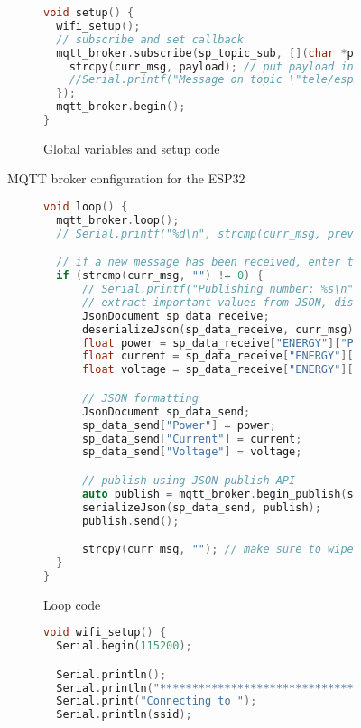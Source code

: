 \begin{appendices}
\begin{figure}[ht]
\begin{subfigure}{\textwidth}
\begin{lstlisting}[language=ino, firstnumber=1]
void setup() {
  wifi_setup();
  // subscribe and set callback
  mqtt_broker.subscribe(sp_topic_sub, [](char *payload) {
    strcpy(curr_msg, payload); // put payload into global message buffer to avoid processing data in the callback
    //Serial.printf("Message on topic \"tele/esp32/smart_plug/SENSOR\": %s\n", payload);
  });
  mqtt_broker.begin();
}
    \end{lstlisting}
        \caption{Global variables and setup code}
    \end{subfigure}
    \caption{MQTT broker configuration for the ESP32}
\end{figure}

\begin{figure}[ht]\ContinuedFloat
    \centering
    \begin{subfigure}{\textwidth}
        \begin{lstlisting}[language=ino, firstnumber=1]
void loop() {
  mqtt_broker.loop();
  // Serial.printf("%d\n", strcmp(curr_msg, prev_msg));

  // if a new message has been received, enter the if
  if (strcmp(curr_msg, "") != 0) {
      // Serial.printf("Publishing number: %s\n", curr_msg);
      // extract important values from JSON, discard unused values
      JsonDocument sp_data_receive;
      deserializeJson(sp_data_receive, curr_msg);
      float power = sp_data_receive["ENERGY"]["Power"];
      float current = sp_data_receive["ENERGY"]["Current"];
      float voltage = sp_data_receive["ENERGY"]["Voltage"];

      // JSON formatting
      JsonDocument sp_data_send;
      sp_data_send["Power"] = power;
      sp_data_send["Current"] = current;
      sp_data_send["Voltage"] = voltage;

      // publish using JSON publish API 
      auto publish = mqtt_broker.begin_publish(sp_topic_pub, measureJson(sp_data_send));
      serializeJson(sp_data_send, publish);
      publish.send();

      strcpy(curr_msg, ""); // make sure to wipe buffer after publishing
  }
}
    \end{lstlisting}
        \caption{Loop code}
    \end{subfigure}
    \begin{subfigure}{\textwidth}
        \begin{lstlisting}[language=ino, firstnumber=1]
void wifi_setup() {
  Serial.begin(115200);

  Serial.println();
  Serial.println("******************************************************");
  Serial.print("Connecting to ");
  Serial.println(ssid);


\end{lstlisting}
\end{subfigure}
\end{figure}
\end{appendices}

